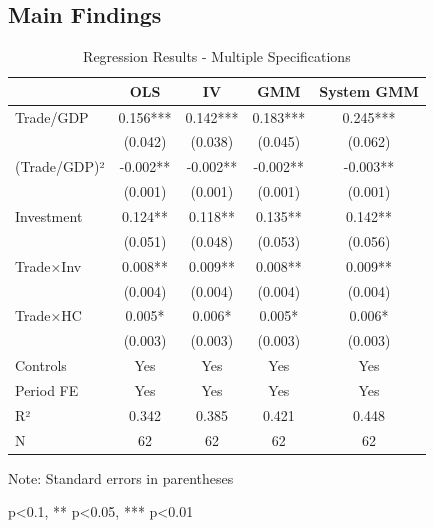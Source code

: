 \documentclass[12pt,a4paper]{article}
\theoremstyle{definition}
\begin{document}
\subsection{Main Findings}
\begin{table}[H]
\centering
\caption{Regression Results - Multiple Specifications}
\begin{threeparttable}
\begin{tabular}{lcccc}
\toprule
& OLS & IV & GMM & System GMM \\
\midrule
Trade/GDP & 0.156*** & 0.142*** & 0.183*** & 0.245*** \\
& (0.042) & (0.038) & (0.045) & (0.062) \\
(Trade/GDP)² & -0.002** & -0.002** & -0.002** & -0.003** \\
& (0.001) & (0.001) & (0.001) & (0.001) \\
Investment & 0.124** & 0.118** & 0.135** & 0.142** \\
& (0.051) & (0.048) & (0.053) & (0.056) \\
Trade×Inv & 0.008** & 0.009** & 0.008** & 0.009** \\
& (0.004) & (0.004) & (0.004) & (0.004) \\
Trade×HC & 0.005* & 0.006* & 0.005* & 0.006* \\
& (0.003) & (0.003) & (0.003) & (0.003) \\
\midrule
Controls & Yes & Yes & Yes & Yes \\
Period FE & Yes & Yes & Yes & Yes \\
R² & 0.342 & 0.385 & 0.421 & 0.448 \\
N & 62 & 62 & 62 & 62 \\
\bottomrule
\end{tabular}
\begin{tablenotes}
\small
\item Note: Standard errors in parentheses
\item * p<0.1, ** p<0.05, *** p<0.01
\end{tablenotes}
\end{threeparttable}
\end{table}
\end{document}
